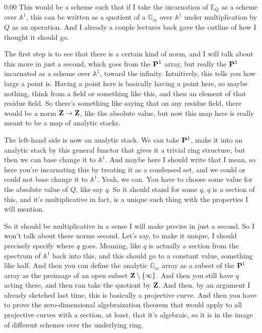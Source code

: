 \begin{unfinished}{0:00}
This would be a scheme such that if I take the incarnation of $\mathbb{E}_Q$ as a scheme over $\mathbb{A}^1$, this can be written as a quotient of a $\mathbb{G}_m$ over $\mathbb{A}^1$ under multiplication by $Q$ as an operation. And I already a couple lectures back gave the outline of how I thought it should go.

The first step is to see that there is a certain kind of norm, and I will talk about this more in just a second, which goes from the $\P^1$ array, but really the $\P^1$ incarnated as a scheme over $\mathbb{A}^1$, toward the infinity. Intuitively, this tells you how large a point is. Having a point here is basically having a point here, so maybe nothing, think from a field or something like this, and then an element of that residue field. So there's something like saying that on any residue field, there would be a norm $\Z \to \Z$, like the absolute value, but now this map here is really meant to be a map of analytic stacks.

The left-hand side is now an analytic stack. We can take $\P^1$, make it into an analytic stack by this general functor that gives it a trivial ring structure, but then we can base change it to $\mathbb{A}^1$. And maybe here I should write that I mean, so here you're incarnating this by treating it as a condensed set, and we could or could not base change it to $\mathbb{A}^1$. Yeah, we can. You have to choose some value for the absolute value of $Q$, like say $q$. So it should stand for some $q$, $q$ is a section of this, and it's multiplicative in fact, is a unique such thing with the properties I will mention. 

So it should be multiplicative in a sense I will make precise in just a second. So I won't talk about these norms second. Let's say, to make it unique, I should precisely specify where $q$ goes. Meaning, like $q$ is actually a section from the spectrum of $\mathbb{A}^1$ back into this, and this should go to a constant value, something like half. And then you can define the analytic $\mathbb{G}_m$ array as a subset of the $\P^1$ array as the preimage of an open subset $\Z\setminus\{\infty\}$. And then you still have $q$ acting there, and then can take the quotient by $\Z$. And then, by an argument I already sketched last time, this is basically a projective curve. And then you have to prove the zero-dimensional algebraization theorem that would apply to all projective curves with a section, at least, that it's algebraic, so it is in the image of different schemes over the underlying ring.


\end{unfinished}
